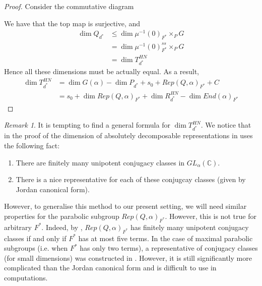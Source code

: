 \documentclass[12pt]{amsart}
\theoremstyle{plain}
\theoremstyle{definition}
\theoremstyle{remark}
\newtheorem{rem}[thm]{Remark}
\begin{document}
\begin{proof}
Consider the commutative diagram
\begin{center}
\end{center}
We have that the top map is surjective, and 
\begin{align*}
  \dim Q_{d^*}&\leq \dim \mu^{-1}(0)_{F^*}\times_{P}G\\& =\dim \mu^{-1}(0)_{F^*}^{ss}\times_PG \\
  &=\dim T_{d^*}^{HN}
\end{align*}
Hence all these dimensions must be actually equal. As a result,
\begin{align*}\dim T_{d^*}^{HN}&=\dim G(\alpha)-\dim P_{d^*}+s_0+Rep(Q,\alpha)_{F^*}+C\\
&=s_0+\dim Rep(Q,\alpha)_{F^*}+\dim R_{d^*}^{HN}-\dim End(\alpha)_{F^*}\end{align*}
\end{proof}
\begin{rem} It is tempting to find a general formula for $\dim T_{d^*}^{HN}$. We notice that in the proof of the dimension of absolutely decomposable representations in \cite{kac1983root} uses the following fact:
\begin{enumerate}
    \item[(i)] There are finitely many unipotent conjugacy classes in $GL_{\alpha}(\mathbb C)$.
    \item[(ii)] There is a nice representative for each of these conjugcay classes (given by Jordan canonical form).
\end{enumerate}
However, to generalise this method to our present setting, we will need similar properties for the parabolic subgroup $Rep(Q,\alpha)_{F^*}$. However, this is not true for arbitrary $F^*$. Indeed, by \cite{hille1999parabolic}, $Rep(Q,\alpha)_{F^*}$ has finitely many unipotent conjugacy classes if and only if $F^*$ has at most five terms. In the case of maximal parabolic subgroups (i.e. when $F^*$ has only two terms), a representative of conjugacy classes (for small dimensions) was constructed in \cite{murray2000conjugacy}. However, it is still significantly more complicated than the Jordan canonical form and is difficult to use in computations.
\end{rem}
\end{document}
